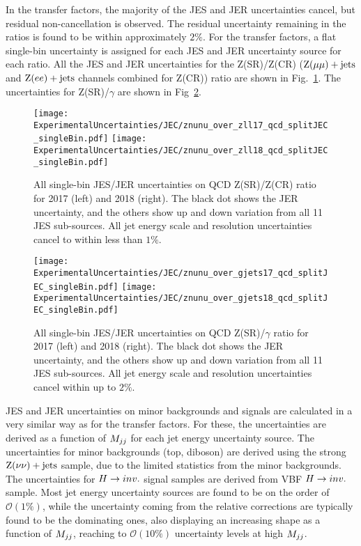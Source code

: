 In the transfer factors, the majority of the JES and JER uncertainties cancel, but residual non-cancellation is observed. The residual uncertainty 
remaining in the ratios is found to be within approximately $2\%$. For the transfer factors, a flat single-bin uncertainty is assigned for each
JES and JER uncertainty source for each ratio. All the JES and JER uncertainties for 
the Z(SR)/Z(CR) ($\mathrm{Z}(\mu\mu)+\textrm{jets}$ and $\mathrm{Z}(ee)+\textrm{jets}$ channels combined for Z(CR)) ratio are shown in Fig.~\ref{fig:znunu_over_zll_jes_jer_uncs}. 
The uncertainties for Z(SR)/$\gamma$ are shown in Fig~\ref{fig:znunu_over_gjets_jes_jer_uncs}. 

\begin{figure}[h!]
  \centering
  \texttt{[image: ExperimentalUncertainties/JEC/znunu\_over\_zll17\_qcd\_splitJEC\_singleBin.pdf]}
  \texttt{[image: ExperimentalUncertainties/JEC/znunu\_over\_zll18\_qcd\_splitJEC\_singleBin.pdf]}
  \caption{All single-bin JES/JER uncertainties on QCD Z(SR)/Z(CR) ratio for 2017 (left) and 2018 (right). 
    The black dot shows the JER uncertainty, and the others show up and down variation from all 11 JES sub-sources. 
    All jet energy scale and resolution uncertainties cancel to within less than $1\%$.
  }
  \label{fig:znunu_over_zll_jes_jer_uncs}
\end{figure}

\begin{figure}[h!]
  \centering
  \texttt{[image: ExperimentalUncertainties/JEC/znunu\_over\_gjets17\_qcd\_splitJEC\_singleBin.pdf]}
  \texttt{[image: ExperimentalUncertainties/JEC/znunu\_over\_gjets18\_qcd\_splitJEC\_singleBin.pdf]}
  \caption{All single-bin JES/JER uncertainties on QCD Z(SR)/$\gamma$ ratio for 2017 (left) and 2018 (right). 
    The black dot shows the JER uncertainty, and the others show up and down variation from all 11 JES sub-sources. 
    All jet energy scale and resolution uncertainties cancel within up to $2\%$.
  }
  \label{fig:znunu_over_gjets_jes_jer_uncs}
\end{figure}

JES and JER uncertainties on minor backgrounds and signals are calculated in a very similar way as for the transfer factors. 
For these, the uncertainties are derived as a function of $M_{jj}$ for each jet energy uncertainty source. The uncertainties for minor backgrounds (top, diboson)
are derived using the strong $\mathrm{Z}(\nu\nu)+\textrm{jets}$ sample, due to the limited statistics from the minor backgrounds. The uncertainties for $H \rightarrow inv.$ signal samples 
are derived from VBF $H \rightarrow inv.$ sample.
Most jet energy uncertainty sources are found to be on the order of $\mathcal{O}(1\%)$, while the uncertainty coming from the relative corrections are typically
found to be the dominating ones, also displaying an increasing shape as a function of $M_{jj}$, reaching to $\mathcal{O}(10\%)$ uncertainty levels at high $M_{jj}$.

